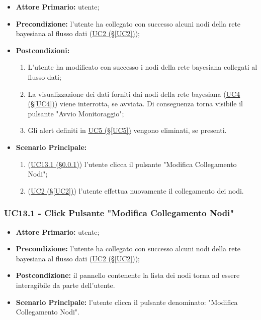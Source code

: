 \begin{itemize}
\item \textbf{Attore Primario:} utente;
\item \textbf{Precondizione:} l'utente ha collegato con successo alcuni nodi della rete bayesiana al flusso dati (\hyperref[UC2]{UC2 (§\ref*{UC2})});
\item \textbf{Postcondizioni:} 
	\begin{enumerate}
	\item L'utente ha modificato con successo i nodi della rete bayesiana collegati al flusso dati;
	\item La visualizzazione dei dati forniti dai nodi della rete bayesiana (\hyperref[UC4]{UC4 (§\ref*{UC4})}) viene interrotta, se avviata. Di conseguenza torna visibile il pulsante "Avvio Monitoraggio";
	\item Gli alert definiti in \hyperref[UC5]{UC5 (§\ref*{UC5})} vengono eliminati, se presenti.
	\end{enumerate}
\item \textbf{Scenario Principale:}
	\begin{enumerate}
	\item (\hyperref[UC13.1]{UC13.1 (§\ref*{UC13.1})}) l'utente clicca il pulsante "Modifica Collegamento Nodi";
	\item (\hyperref[UC2]{UC2 (§\ref*{UC2})}) l'utente effettua nuovamente il collegamento dei nodi.
	\end{enumerate}
\end{itemize}

\subsubsection{UC13.1 - Click Pulsante "Modifica Collegamento Nodi"}\label{UC13.1}
\begin{itemize}
\item \textbf{Attore Primario:} utente;
\item \textbf{Precondizione:} l'utente ha collegato con successo alcuni nodi della rete bayesiana al flusso dati 			(\hyperref[UC2]{UC2 (§\ref*{UC2})});
\item \textbf{Postcondizione:} il pannello contenente la lista dei nodi torna ad essere interagibile da parte dell'utente.
\item \textbf{Scenario Principale:} l'utente clicca il pulsante denominato: "Modifica Collegamento Nodi".
\end{itemize}
\newpage

